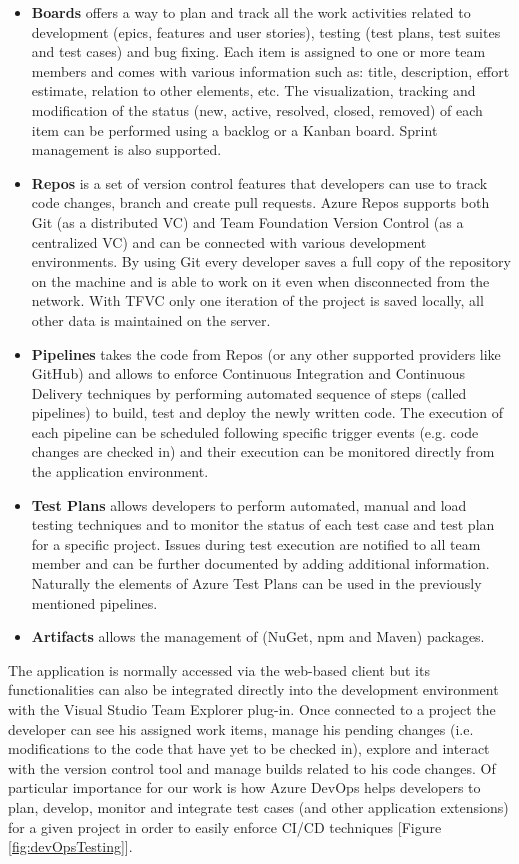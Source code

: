 \begin{itemize}
    \item \textbf{Boards} offers a way to plan and track all the work activities related to development (epics, features and user stories), testing (test plans, test suites and test cases) and bug fixing. Each item is assigned to one or more team members and comes with various information such as: title, description, effort estimate, relation to other elements, etc. The visualization, tracking and modification of the status (new, active, resolved, closed, removed) of each item can be performed using a backlog or a Kanban board. Sprint management is also supported.
    \item \textbf{Repos} is a set of version control features that developers can use to track code changes, branch and create pull requests. Azure Repos supports both Git (as a distributed VC) and Team Foundation Version Control (as a centralized VC) and can be connected with various development environments. By using Git every developer saves a full copy of the repository on the machine and is able to work on it even when disconnected from the network. With TFVC only one iteration of the project is saved locally, all other data is maintained on the server.
    \item \textbf{Pipelines} takes the code from Repos (or any other supported providers like GitHub) and allows to enforce Continuous Integration and Continuous Delivery techniques by performing automated sequence of steps (called pipelines) to build, test and deploy the newly written code. The execution of each pipeline can be scheduled following specific trigger events (e.g. code changes are checked in) and their execution can be monitored directly from the application environment.
    \item \textbf{Test Plans} allows developers to perform automated, manual and load testing techniques and to monitor the status of each test case and test plan for a specific project. Issues during test execution are notified to all team member and can be further documented by adding additional information. Naturally the elements of Azure Test Plans can be used in the previously mentioned pipelines.
    \item \textbf{Artifacts} allows the management of (NuGet, npm and Maven) packages.
\end{itemize}

The application is normally accessed via the web-based client but its functionalities can also be integrated directly into the development environment with the Visual Studio Team Explorer plug-in. Once connected to a project the developer can see his assigned work items, manage his pending changes (i.e. modifications to the code that have yet to be checked in), explore and interact with the version control tool and manage builds related to his code changes. Of particular importance for our work is how Azure DevOps helps developers to plan, develop, monitor and integrate test cases (and other application extensions) for a given project in order to easily enforce CI/CD techniques [Figure \ref{fig:devOpsTesting}].

